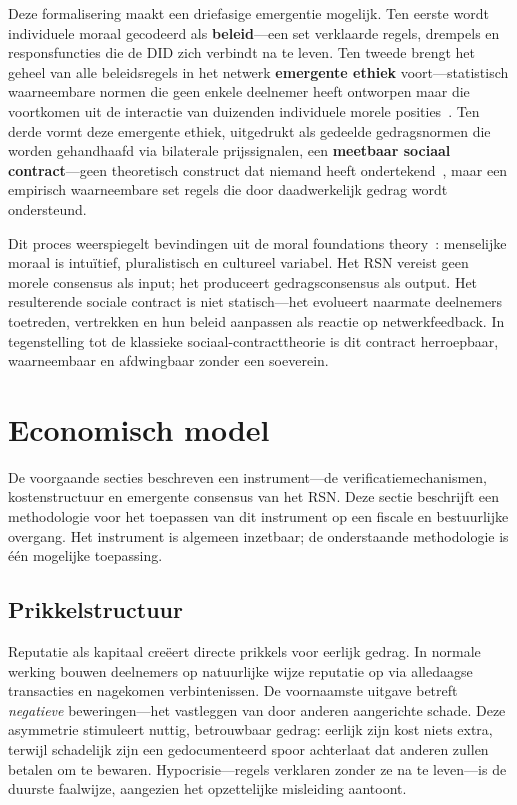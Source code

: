 \documentclass[11pt,a4paper,twocolumn]{article}
\begin{document}
Deze formalisering maakt een driefasige emergentie mogelijk. Ten eerste wordt individuele moraal gecodeerd als \textbf{beleid}---een set verklaarde regels, drempels en responsfuncties die de DID zich verbindt na te leven. Ten tweede brengt het geheel van alle beleidsregels in het netwerk \textbf{emergente ethiek} voort---statistisch waarneembare normen die geen enkele deelnemer heeft ontworpen maar die voortkomen uit de interactie van duizenden individuele morele posities~\cite{durkheim1893}. Ten derde vormt deze emergente ethiek, uitgedrukt als gedeelde gedragsnormen die worden gehandhaafd via bilaterale prijssignalen, een \textbf{meetbaar sociaal contract}---geen theoretisch construct dat niemand heeft ondertekend~\cite{rawls1971}, maar een empirisch waarneembare set regels die door daadwerkelijk gedrag wordt ondersteund.

Dit proces weerspiegelt bevindingen uit de moral foundations theory~\cite{haidt2012}: menselijke moraal is intuïtief, pluralistisch en cultureel variabel. Het RSN vereist geen morele consensus als input; het produceert gedragsconsensus als output. Het resulterende sociale contract is niet statisch---het evolueert naarmate deelnemers toetreden, vertrekken en hun beleid aanpassen als reactie op netwerkfeedback. In tegenstelling tot de klassieke sociaal-contracttheorie is dit contract herroepbaar, waarneembaar en afdwingbaar zonder een soeverein.

\section{Economisch model}

De voorgaande secties beschreven een instrument---de verificatiemechanismen, kostenstructuur en emergente consensus van het RSN. Deze sectie beschrijft een methodologie voor het toepassen van dit instrument op een fiscale en bestuurlijke overgang. Het instrument is algemeen inzetbaar; de onderstaande methodologie is één mogelijke toepassing.

\subsection{Prikkelstructuur}

Reputatie als kapitaal creëert directe prikkels voor eerlijk gedrag. In normale werking bouwen deelnemers op natuurlijke wijze reputatie op via alledaagse transacties en nagekomen verbintenissen. De voornaamste uitgave betreft \emph{negatieve} beweringen---het vastleggen van door anderen aangerichte schade. Deze asymmetrie stimuleert nuttig, betrouwbaar gedrag: eerlijk zijn kost niets extra, terwijl schadelijk zijn een gedocumenteerd spoor achterlaat dat anderen zullen betalen om te bewaren. Hypocrisie---regels verklaren zonder ze na te leven---is de duurste faalwijze, aangezien het opzettelijke misleiding aantoont.
\end{document}
